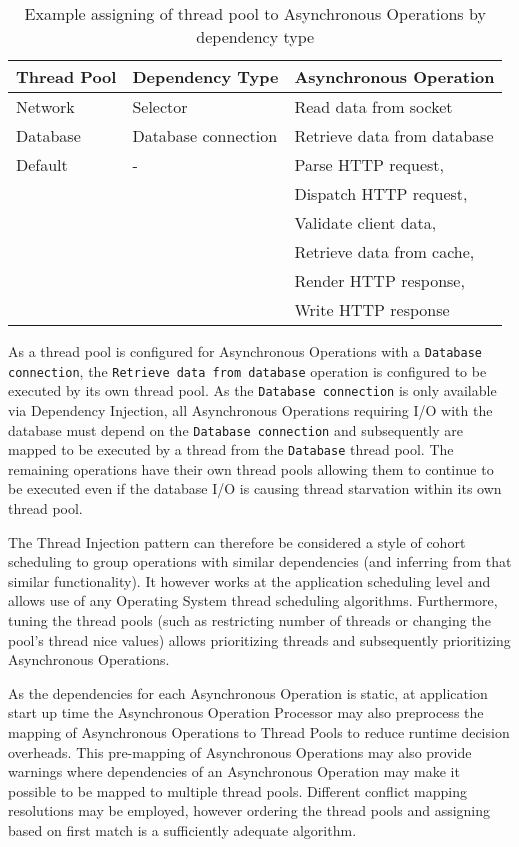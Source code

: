 \documentclass{article}
\begin{document}
\begin{table}[!h]
\renewcommand{\arraystretch}{1.3}
\centering
\begin{tabular}{l||l||l}
\hline
\bfseries Thread Pool & \bfseries Dependency Type & \bfseries Asynchronous Operation \\
\hline\hline
Network & Selector & Read data from socket \\
\hline
Database & Database connection & Retrieve data from database \\
\hline
Default & - & Parse HTTP request, \\
& & Dispatch HTTP request, \\
& & Validate client data, \\ 
& & Retrieve data from cache, \\
& & Render HTTP response, \\
& & Write HTTP response \\
\hline
\end{tabular}
\caption{Example assigning of thread pool to Asynchronous Operations by dependency type}
\label{tab:example_request_thread_pools}
\end{table}

As a thread pool is configured for Asynchronous Operations with a
\texttt{Database connection}, the \texttt{Retrieve data from database} operation
is configured to be executed by its own thread pool.  As the \texttt{Database
connection} is only available via Dependency Injection, all Asynchronous
Operations requiring I/O with the database must depend on the \texttt{Database
connection} and subsequently are mapped to be executed by a thread from the
\texttt{Database} thread pool.  The remaining operations have their own thread
pools allowing them to continue to be executed even if the database I/O is
causing thread starvation within its own thread pool.

The Thread Injection pattern can therefore be considered a style of cohort
scheduling \cite{cohort} to group operations with similar dependencies (and
inferring from that similar functionality).  It however works at the application
scheduling level and allows use of any Operating System thread scheduling
algorithms.  Furthermore, tuning the thread pools (such as restricting number of
threads or changing the pool's thread nice values) allows prioritizing threads and
subsequently prioritizing Asynchronous Operations.

As the dependencies for each Asynchronous Operation is static, at application
start up time the Asynchronous Operation Processor may also preprocess the
mapping of Asynchronous Operations to Thread Pools to reduce runtime decision
overheads.  This pre-mapping of Asynchronous Operations may also provide
warnings where dependencies of an Asynchronous Operation may make it possible to
be mapped to multiple thread pools.  Different conflict mapping resolutions may
be employed, however ordering the thread pools and assigning based on first
match is a sufficiently adequate algorithm.
\end{document}
